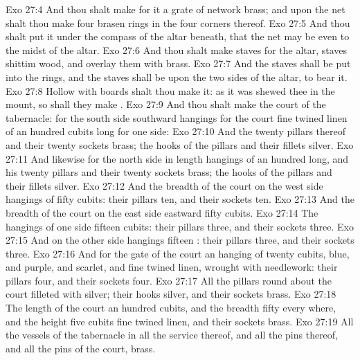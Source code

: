 \vs Exo 27:4 And thou shalt make for it a grate of network  brass; and upon the net shalt thou make four brasen rings in the four corners thereof.
\vs Exo 27:5 And thou shalt put it under the compass of the altar beneath, that the net may be even to the midst of the altar.
\vs Exo 27:6 And thou shalt make staves for the altar, staves  shittim wood, and overlay them with brass.
\vs Exo 27:7 And the staves shall be put into the rings, and the staves shall be upon the two sides of the altar, to bear it.
\vs Exo 27:8 Hollow with boards shalt thou make it: as it was shewed thee in the mount, so shall they make .
\vs Exo 27:9 And thou shalt make the court of the tabernacle: for the south side southward  hangings for the court  fine twined linen of an hundred cubits long for one side:
\vs Exo 27:10 And the twenty pillars thereof and their twenty sockets  brass; the hooks of the pillars and their fillets  silver.
\vs Exo 27:11 And likewise for the north side in length  hangings of an hundred  long, and his twenty pillars and their twenty sockets  brass; the hooks of the pillars and their fillets  silver.
\vs Exo 27:12 And  the breadth of the court on the west side  hangings of fifty cubits: their pillars ten, and their sockets ten.
\vs Exo 27:13 And the breadth of the court on the east side eastward  fifty cubits.
\vs Exo 27:14 The hangings of one side  fifteen cubits: their pillars three, and their sockets three.
\vs Exo 27:15 And on the other side  hangings fifteen : their pillars three, and their sockets three.
\vs Exo 27:16 And for the gate of the court  an hanging of twenty cubits,  blue, and purple, and scarlet, and fine twined linen, wrought with needlework:  their pillars  four, and their sockets four.
\vs Exo 27:17 All the pillars round about the court  filleted with silver; their hooks  silver, and their sockets  brass.
\vs Exo 27:18 The length of the court  an hundred cubits, and the breadth fifty every where, and the height five cubits  fine twined linen, and their sockets  brass.
\vs Exo 27:19 All the vessels of the tabernacle in all the service thereof, and all the pins thereof, and all the pins of the court,  brass.
